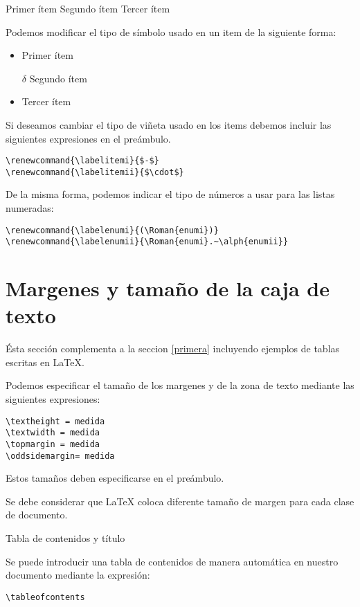 \documentclass[letterpaper,12pt]{article}
\begin{document}
Primer ítem
Segundo ítem
Tercer ítem

Podemos modificar el tipo de símbolo usado en un item de la siguiente forma:

\begin{itemize}
	\item Primer ítem
	\item[$\delta$] Segundo ítem
	\item Tercer ítem
\end{itemize}

Si deseamos cambiar el tipo de viñeta usado en los items debemos incluir las siguientes expresiones en el preámbulo.

\begin{verbatim}
\renewcommand{\labelitemi}{$-$}
\renewcommand{\labelitemii}{$\cdot$}
\end{verbatim}

De la misma forma, podemos indicar el tipo de números a usar para las listas numeradas:

\begin{verbatim}
\renewcommand{\labelenumi}{(\Roman{enumi})}
\renewcommand{\labelenumii}{\Roman{enumi}.~\alph{enumii}}
\end{verbatim}

\section{Margenes y tamaño de la caja de texto}

Ésta sección complementa a la seccion \ref{primera} incluyendo ejemplos de tablas escritas en \LaTeX.

Podemos especificar el tamaño de los margenes y de la zona de texto mediante las siguientes expresiones:

\begin{verbatim}
\textheight = medida
\textwidth = medida
\topmargin = medida
\oddsidemargin= medida
\end{verbatim}

Estos tamaños deben especificarse en el preámbulo.

Se debe considerar que \LaTeX{} coloca diferente tamaño de margen para cada clase de documento.

Tabla de contenidos y título

Se puede introducir una tabla de contenidos de manera automática en nuestro documento mediante la expresión:

\begin{verbatim}
\tableofcontents
\end{verbatim}
\end{document}
